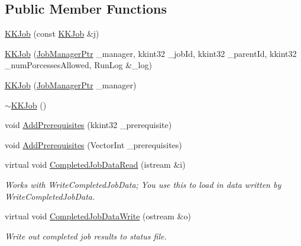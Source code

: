 \subsection*{Public Member Functions}
\begin{DoxyCompactItemize}
\item 
\hyperlink{class_k_k_job_managment_1_1_k_k_job_a103bcdeba8df3f5e36ae834949d96997}{K\+K\+Job} (const \hyperlink{class_k_k_job_managment_1_1_k_k_job}{K\+K\+Job} \&j)
\item 
\hyperlink{class_k_k_job_managment_1_1_k_k_job_ae3736e42db65bef1356f372968603f24}{K\+K\+Job} (\hyperlink{namespace_k_k_job_managment_aa12a7270f9983ca4ed916533dc8adbc4}{Job\+Manager\+Ptr} \+\_\+manager, kkint32 \+\_\+job\+Id, kkint32 \+\_\+parent\+Id, kkint32 \+\_\+num\+Porcesses\+Allowed, Run\+Log \&\+\_\+log)
\item 
\hyperlink{class_k_k_job_managment_1_1_k_k_job_a8d675821ebb8359f5b6367d5fc575d77}{K\+K\+Job} (\hyperlink{namespace_k_k_job_managment_aa12a7270f9983ca4ed916533dc8adbc4}{Job\+Manager\+Ptr} \+\_\+manager)
\item 
\hyperlink{class_k_k_job_managment_1_1_k_k_job_a178f21e441acf1649618c8c4b0f9bc28}{$\sim$\+K\+K\+Job} ()
\item 
void \hyperlink{class_k_k_job_managment_1_1_k_k_job_ab0980c73c7664baedf96a6b265c52974}{Add\+Prerequisites} (kkint32 \+\_\+prerequisite)
\item 
void \hyperlink{class_k_k_job_managment_1_1_k_k_job_a123f6389e17e3c968cc2f81e9bb44106}{Add\+Prerequisites} (Vector\+Int \+\_\+prerequisites)
\item 
virtual void \hyperlink{class_k_k_job_managment_1_1_k_k_job_a28738773cc6a5b58bc12e2a983171ec2}{Completed\+Job\+Data\+Read} (istream \&i)
\begin{DoxyCompactList}\small\item\em Works with \textquotesingle{}Write\+Completed\+Job\+Data\textquotesingle{}; You use this to load in data written by \textquotesingle{}Write\+Completed\+Job\+Data\textquotesingle{}. \end{DoxyCompactList}\item 
virtual void \hyperlink{class_k_k_job_managment_1_1_k_k_job_aa795de2f00305547e2585541f9117c74}{Completed\+Job\+Data\+Write} (ostream \&o)
\begin{DoxyCompactList}\small\item\em Write out completed job results to status file. \end{DoxyCompactList}\item 

\end{DoxyCompactItemize}
